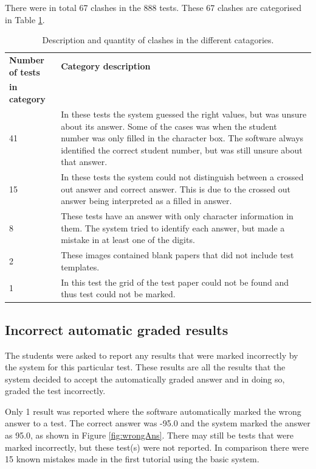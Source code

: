 There were in total 67 clashes in the 888 tests. These 67 clashes are categorised in Table  \ref{tbl:TutClash}.
\begin{table}
  \centering
  \caption{Description and quantity of clashes in the different catagories.} \label{tbl:TutClash}
\begin{tabular}{|p{3cm}|p{8cm}|}
\hline
\textbf{Number of tests} & \textbf{Category description}\\
\textbf{in category} &\\
\hline
41&In these tests the system guessed the right values, but was unsure about its answer. Some of the cases was when the student number was only filled in the character box. The software always identified the correct student number, but was still unsure about that answer.\\
\hline
15&In these tests the system could not distinguish between a crossed out answer and correct answer. This is due to the crossed out answer being interpreted as a filled in answer.\\
\hline
8&These tests have an answer with only character information in them. The system tried to identify each answer, but made a mistake in at least one of the digits.\\
\hline
2&These images contained blank papers that did not include test templates.\\
\hline
1&In this test the grid of the test paper could not be found and thus test could not be marked.\\
\hline
\end{tabular}
\end{table}

\subsection{Incorrect automatic graded results}

The students were asked to report any results that were marked incorrectly by the system for this particular test. These results are all the results that the system decided to accept the automatically graded answer and in doing so, graded the test incorrectly.

Only 1 result was reported where the software automatically marked the wrong answer to a test. The correct answer was -95.0 and the system marked the answer as 95.0, as shown in Figure \ref{fig:wrongAns}. There may still be tests that were marked incorrectly, but these test(s) were not reported. In comparison there were 15 known mistakes made in the first tutorial using the basic system.

